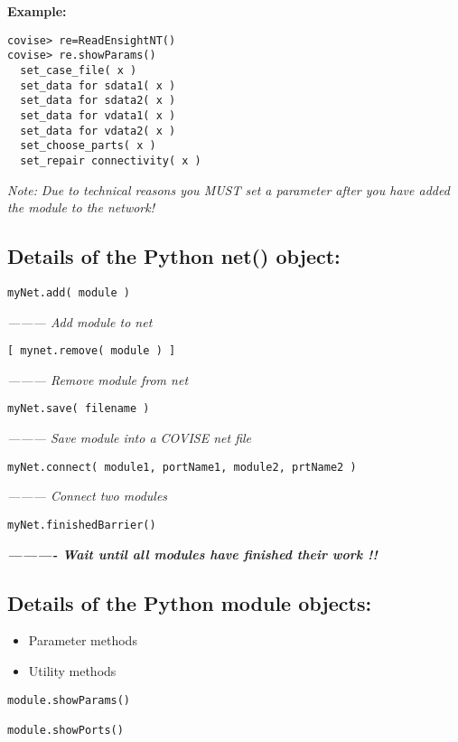 {\bf Example:}

\begin{verbatim}
covise> re=ReadEnsightNT()
covise> re.showParams()
  set_case_file( x )
  set_data for sdata1( x )
  set_data for sdata2( x )
  set_data for vdata1( x )
  set_data for vdata2( x )
  set_choose_parts( x )
  set_repair connectivity( x )
\end{verbatim}

{\it Note:}\newline
{\it Due to technical reasons you MUST set a parameter after you have added the module to the
network!}

\subsection{Details of the Python net() object:}

\begin{verbatim}
myNet.add( module )			
\end{verbatim}
	{\it --------- Add module to net}
\begin{verbatim}
[ mynet.remove( module ) ]		
\end{verbatim}
	{\it --------- Remove module from net}
\begin{verbatim}
myNet.save( filename )			
\end{verbatim}
	{\it --------- Save module into a COVISE net file}
\begin{verbatim}
myNet.connect( module1, portName1, module2, prtName2 )	
\end{verbatim}
	{\it --------- Connect two modules}
\begin{verbatim}
myNet.finishedBarrier() 		
\end{verbatim}
	\textit{\textbf{ ---------- Wait until all modules have finished their work !!}}
\vspace{0.5cm}

\subsection{Details of the Python module objects:}

\begin{itemize}
\item Parameter methods
\item Utility methods 
\end{itemize}

\begin{verbatim}
module.showParams()

module.showPorts()
\end{verbatim}

